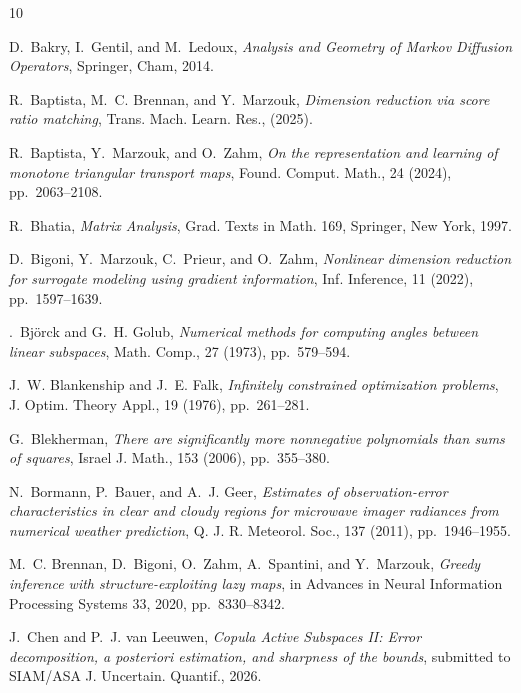 \begin{thebibliography}{10}

{\sc D.~Bakry, I.~Gentil, and M.~Ledoux}, {\em Analysis and Geometry of Markov Diffusion Operators}, Springer, Cham, 2014.

{\sc R.~Baptista, M.~C. Brennan, and Y.~Marzouk}, {\em Dimension reduction via score ratio matching}, Trans. Mach. Learn. Res., (2025).

{\sc R.~Baptista, Y.~Marzouk, and O.~Zahm}, {\em On the representation and learning of monotone triangular transport maps}, Found. Comput. Math., 24 (2024), pp.~2063--2108.

{\sc R.~Bhatia}, {\em Matrix Analysis}, Grad. Texts in Math. 169, Springer, New York, 1997.

{\sc D.~Bigoni, Y.~Marzouk, C.~Prieur, and O.~Zahm}, {\em Nonlinear dimension reduction for surrogate modeling using gradient information}, Inf. Inference, 11 (2022), pp.~1597--1639.

{\sc {\AA}.~Bj{\"o}rck and G.~H. Golub}, {\em Numerical methods for computing angles between linear subspaces}, Math. Comp., 27 (1973), pp.~579--594.

{\sc J.~W. Blankenship and J.~E. Falk}, {\em Infinitely constrained optimization problems}, J. Optim. Theory Appl., 19 (1976), pp.~261--281.

{\sc G.~Blekherman}, {\em There are significantly more nonnegative polynomials than sums of squares}, Israel J. Math., 153 (2006), pp.~355--380.

{\sc N.~Bormann, P.~Bauer, and A.~J. Geer}, {\em Estimates of observation-error characteristics in clear and cloudy regions for microwave imager radiances from numerical weather prediction}, Q. J. R. Meteorol. Soc., 137 (2011), pp.~1946--1955.

{\sc M.~C. Brennan, D.~Bigoni, O.~Zahm, A.~Spantini, and Y.~Marzouk}, {\em Greedy inference with structure-exploiting lazy maps}, in Advances in Neural Information Processing Systems 33, 2020, pp.~8330--8342.

{\sc J.~Chen and P.~J. van Leeuwen}, {\em Copula Active Subspaces II: Error decomposition, a posteriori estimation, and sharpness of the bounds}, submitted to SIAM/ASA J. Uncertain. Quantif., 2026.


\end{thebibliography}
